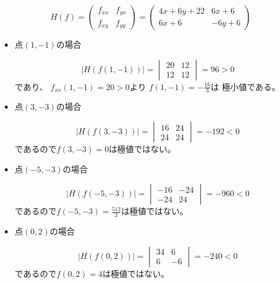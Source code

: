\documentclass[12pt,b5paper]{ltjsarticle}
\begin{document}
\begin{enumerate}
\begin{enumerate}
\begin{equation}
 H(f) =
  \begin{pmatrix}
   f_{xx} & f_{yx}\\
   f_{xy} & f_{yy}
  \end{pmatrix}
  =
  \begin{pmatrix}
   4x+6y+22 & 6x+6\\
   6x+6 & -6y+6
  \end{pmatrix}
\end{equation}

\begin{itemize}
 \item
点$(1,-1)$の場合

\begin{equation}
 \lvert H(f(1,-1)) \rvert =
  \begin{vmatrix}
   20 & 12\\
   12 & 12
  \end{vmatrix}
  = 96 >0
\end{equation}
であり、
$f_{xx}(1,-1)=20>0$より
$f(1,-1)=-\frac{16}{3}$は
極小値である。
 \item
点$(3,-3)$の場合

\begin{equation}
 \lvert H(f(3,-3)) \rvert =
  \begin{vmatrix}
   16 & 24\\
   24 & 24
  \end{vmatrix}
  = -192 <0
\end{equation}
であるので$f(3,-3)=0$は極値ではない。

 \item
点$(-5,-3)$の場合

\begin{equation}
 \lvert H(f(-5,-3)) \rvert =
  \begin{vmatrix}
   -16 & -24\\
   -24 & 24
  \end{vmatrix}
  = -960 <0
\end{equation}
であるので$f(-5,-3)=\frac{512}{3}$は極値ではない。

 \item
点$(0,2)$の場合

\begin{equation}
 \lvert H(f(0,2)) \rvert =
  \begin{vmatrix}
   34 & 6\\
   6 & -6
  \end{vmatrix}
  = -240 <0
\end{equation}
であるので$f(0,2)=4$は極値ではない。
\end{itemize}


\end{enumerate}
\end{enumerate}
\end{document}
